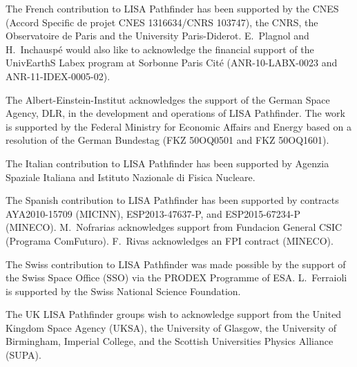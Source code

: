 \documentclass[preprint, trackchanges]{aastex61}
\begin{document}
The French contribution to LISA Pathfinder has been supported by the CNES (Accord Specific de projet
CNES 1316634/CNRS 103747), the CNRS, the Observatoire de Paris and the University
Paris-Diderot. E.~Plagnol and H.~Inchausp\'{e} would also like to acknowledge the
financial support of the UnivEarthS Labex program at Sorbonne Paris Cit\'{e}
(ANR-10-LABX-0023 and ANR-11-IDEX-0005-02).

The Albert-Einstein-Institut acknowledges the support of the German Space Agency,
DLR, in the development and operations of LISA Pathfinder. The work is supported by the Federal Ministry for Economic Affairs and Energy
based on a resolution of the German Bundestag (FKZ 50OQ0501 and FKZ 50OQ1601). 

The Italian contribution to LISA Pathfinder has been supported  by Agenzia Spaziale Italiana and Istituto
Nazionale di Fisica Nucleare.

The Spanish contribution to LISA Pathfinder has been supported by contracts AYA2010-15709 (MICINN),
ESP2013-47637-P, and ESP2015-67234-P (MINECO). M.~Nofrarias acknowledges support from
Fundacion General CSIC (Programa ComFuturo). F.~Rivas acknowledges an FPI contract
(MINECO).

The Swiss contribution to LISA Pathfinder was made possible by the support of the Swiss Space Office (SSO)
via the PRODEX Programme of ESA. L.~Ferraioli is supported by the Swiss National
Science Foundation.

The UK LISA Pathfinder groups wish to acknowledge support from the United Kingdom Space Agency
(UKSA), the University of Glasgow, the University of Birmingham, Imperial College,
and the Scottish Universities Physics Alliance (SUPA).

%

\vspace{5mm}

\end{document}
